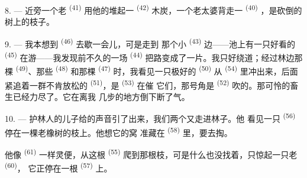 8. --- 近旁一个老 \textsuperscript{(41)} 用他的堆起一
 \textsuperscript{(42)} 木炭，一个老太婆背走一 \textsuperscript{(40)}
，是砍倒的树上的枝子。

\VUsaut{3.0mm}
\VUsaut{3.0mm}

9. --- 我本想到 \textsuperscript{(46)} 去歇一会儿，可是走到
那个小 \textsuperscript{(43)} 边——池上有一只好看的
\textsuperscript{(45)} 在游——我发现前不久的一场 \textsuperscript{(44)}
把路变成了一片。我只好绕道；经过林边那棵
\textsuperscript{(49)}、那些 \textsuperscript{(48)} 和那棵
\textsuperscript{(47)} 时，我看见一只极好的 \textsuperscript{(50)} 从
 \textsuperscript{(54)} 里冲出来，后面紧追着一群不肯放松的
 \textsuperscript{(51)}，是 \textsuperscript{(53)} 在催
它们，那号角是 \textsuperscript{(52)} 吹的。那可怜的畜生已经力尽了。它在离我
几步的地方倒下断了气。

10. --- 护林人的儿子给的声音引了出来，我们两个又走进林子。他
看见一只 \textsuperscript{(56)} 停在一棵老橡树的枝上。他想它的窝
准藏在 \textsuperscript{(58)} 里，要去掏。

他像 \textsuperscript{(61)} 一样灵便，从这根 \textsuperscript{(55)}
爬到那根枝，可是什么也没找着，只惊起一只老 \textsuperscript{(60)}，
它正停在一根 \textsuperscript{(57)} 上。
\VUsaut{4.0mm}
\VUfilet{22mm}

